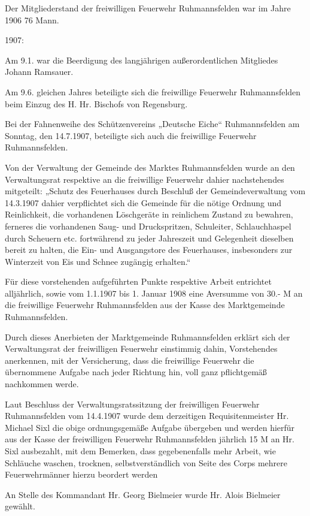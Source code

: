 \documentclass{book}
\begin{document}
Der Mitgliederstand der freiwilligen Feuerwehr Ruhmannsfelden war im Jahre 1906
76 Mann.

1907:

Am 9.1. war die Beerdigung des langjährigen außerordentlichen Mitgliedes Johann
Ramsauer.

Am 9.6. gleichen Jahres beteiligte sich die freiwillige Feuerwehr Ruhmannsfelden
beim Einzug des H. Hr. Bischofs von Regensburg.

Bei der Fahnenweihe des Schützenvereins „Deutsche Eiche“ Ruhmannsfelden am
Sonntag, den 14.7.1907, beteiligte sich auch die freiwillige Feuerwehr
Ruhmannsfelden.

Von der Verwaltung der Gemeinde des Marktes Ruhmannsfelden wurde an den
Verwaltungsrat respektive an die freiwillige Feuerwehr dahier nachstehendes
mitgeteilt: „Schutz des Feuerhauses durch Beschluß der Gemeindeverwaltung vom
14.3.1907 dahier verpflichtet sich die Gemeinde für die nötige Ordnung und
Reinlichkeit, die vorhandenen Löschgeräte in reinlichem Zustand zu bewahren,
ferneres die vorhandenen Saug- und Druckspritzen, Schuleiter, Schlauchhaspel
durch Scheuern etc. fortwährend zu jeder Jahreszeit und Gelegenheit dieselben
bereit zu halten, die Ein- und Ausgangstore des Feuerhauses, insbesonders zur
Winterzeit von Eis und Schnee zugängig erhalten.“

Für diese vorstehenden aufgeführten Punkte respektive Arbeit entrichtet
alljährlich, sowie vom 1.1.1907 bis 1. Januar 1908 eine Aversumme von 30.- M an
die freiwillige Feuerwehr Ruhmannsfelden aus der Kasse des Marktgemeinde
Ruhmannsfelden.

Durch dieses Anerbieten der Marktgemeinde Ruhmannsfelden erklärt sich der
Verwaltungsrat der freiwilligen Feuerwehr einstimmig dahin, Vorstehendes
anerkennen, mit der Versicherung, dass die freiwillige Feuerwehr die übernommene
Aufgabe nach jeder Richtung hin, voll ganz pflichtgemäß nachkommen werde.

Laut Beschluss der Verwaltungsratssitzung der freiwilligen Feuerwehr
Ruhmannsfelden vom 14.4.1907 wurde dem derzeitigen Requisitenmeister Hr. Michael
Sixl die obige ordnungsgemäße Aufgabe übergeben und werden hierfür aus der Kasse
der freiwilligen Feuerwehr Ruhmannsfelden jährlich 15 M an Hr. Sixl ausbezahlt,
mit dem Bemerken, dass gegebenenfalls mehr Arbeit, wie Schläuche waschen,
trocknen, selbstverständlich von Seite des Corps mehrere Feuerwehrmänner hierzu
beordert werden

An Stelle des Kommandant Hr. Georg Bielmeier wurde Hr. Alois Bielmeier gewählt.
\end{document}
